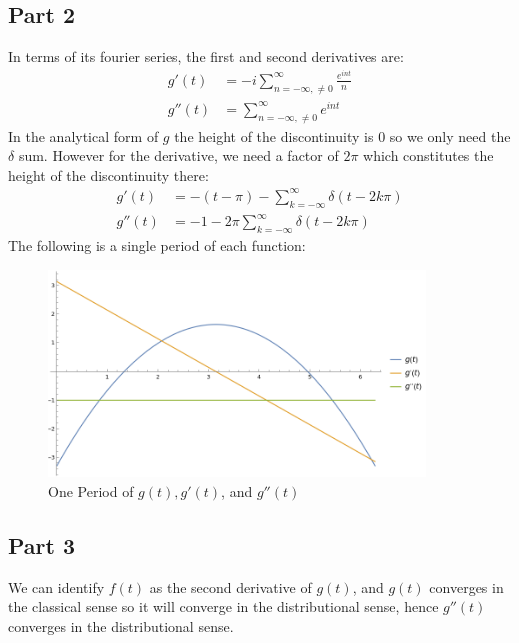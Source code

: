 \documentclass[12pt]{article}
\begin{document}
\subsection*{Part 2}
In terms of its fourier series, the first and second derivatives are:
\begin{equation}
  \boxed{
    \begin{aligned}
      g'(t)&=-i\sum_{n=-\infty,\neq0}^\infty\frac{e^{int}}{n}\\
      g''(t)&=\sum_{n=-\infty,\neq0}^\infty e^{int}
    \end{aligned}
  }
\end{equation}
In the analytical form of $g$ the height of the discontinuity is $0$ so we only need the $\delta$ sum. However for the derivative, we need a factor of $2\pi$ which constitutes the height of the discontinuity there:
\begin{equation}
  \boxed{
    \begin{aligned}
      g'(t)&=-(t-\pi)-\sum_{k=-\infty}^\infty\delta(t-2k\pi)\\
      g''(t)&=-1-2\pi\sum_{k=-\infty}^\infty\delta(t-2k\pi)
    \end{aligned}
  }
\end{equation}
The following is a single period of each function:
\begin{figure}[H]
  \centering
  \includegraphics[width=10cm]{fourierplot.png}
  \caption{One Period of $g(t), g'(t)$, and $g''(t)$}
  \label{fig:1}
\end{figure}
\subsection*{Part 3}
We can identify $f(t)$ as the second derivative of $g(t)$, and $g(t)$ converges in the classical sense so it will converge in the distributional sense, hence $g''(t)$ converges in the distributional sense.
\end{document}

